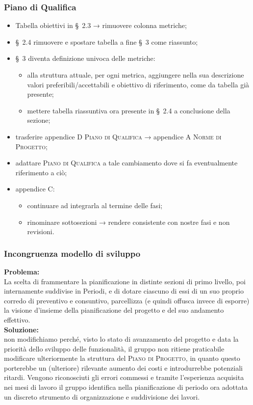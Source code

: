 \subsubsection{Piano di Qualifica}
\begin{itemize}
	\item Tabella obiettivi in \S\ 2.3 → rimuovere colonna metriche;

	\item \S\ 2.4 rimuovere e spostare tabella a fine \S\ 3 come riassunto;

	\item \S\ 3 diventa definizione univoca delle metriche:
	\begin{itemize}
		\item alla struttura attuale, per ogni metrica, aggiungere nella sua descrizione valori preferibili/accettabili e obiettivo di riferimento, come da tabella già presente;
		\item mettere tabella riassuntiva ora presente in \S\ 2.4 a conclusione della sezione;
	\end{itemize}
	\item trasferire appendice D \textsc{Piano di Qualifica} → appendice A \textsc{Norme di Progetto};

	\item adattare \textsc{Piano di Qualifica} a tale cambiamento dove si fa eventualmente riferimento a ciò;

	\item appendice C:
	\begin{itemize}
		\item continuare ad integrarla al termine delle fasi;

		\item rinominare sottosezioni → rendere consistente con nostre fasi e non revisioni.
	\end{itemize}

\end{itemize}

\subsubsection{Incongruenza modello di sviluppo}
\textbf{Problema:}\\
La scelta di frammentare la pianificazione in distinte sezioni di primo livello, poi internamente suddivise in Periodi, e di dotare ciascuno di essi di un suo proprio corredo di preventivo e consuntivo, parcellizza (e quindi offusca invece di esporre) la visione d'insieme della pianificazione del progetto e del suo andamento effettivo.\\
\textbf{Soluzione:}\\
non modifichiamo perché, visto lo stato di avanzamento del progetto e data la priorità dello sviluppo delle funzionalità, il gruppo non ritiene praticabile modificare ulteriormente la struttura del \textsc{Piano di Progetto}, in quanto questo porterebbe un (ulteriore) rilevante aumento dei costi e introdurrebbe potenziali ritardi. Vengono riconosciuti gli errori commessi e tramite l'esperienza acquisita nei mesi di lavoro il gruppo identifica nella pianificazione di periodo ora adottata un discreto strumento di organizzazione e suddivisione dei lavori.

